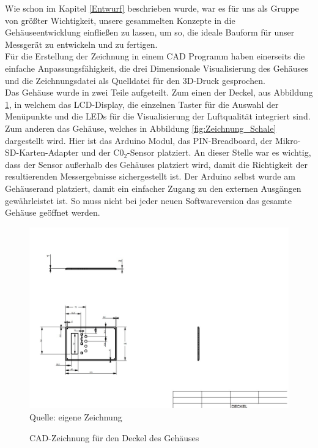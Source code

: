 \label{CADZeichnung}

Wie schon im Kapitel \ref{Entwurf} beschrieben wurde, war es für uns als Gruppe von größter Wichtigkeit, unsere gesammelten Konzepte in die Gehäuseentwicklung einfließen zu lassen, um so, die ideale Bauform für unser Messgerät zu entwickeln und zu fertigen. \\
Für die Erstellung der Zeichnung in einem CAD Programm haben einerseits die einfache Anpassungsfähigkeit, die drei Dimensionale Visualisierung des Gehäuses und die Zeichnungsdatei als Quelldatei für den 3D-Druck gesprochen.\\
Das Gehäuse wurde in zwei Teile aufgeteilt. Zum einen der Deckel, aus Abbildung \ref{fig:Zeichnung_Deckel}, in welchem das \ac{LCD}-Display, die einzelnen Taster für die Auswahl der Menüpunkte und die \ac{LED}s für die Visualisierung der Luftqualität integriert sind. \\
Zum anderen das Gehäuse, welches in Abbildung \ref{fig:Zeichnung_Schale} dargestellt wird. Hier ist das Arduino Modul, das PIN-Breadboard, der Mikro-SD-Karten-Adapter und der C0$_2$-Sensor platziert. An dieser Stelle war es wichtig, dass der Sensor außerhalb des Gehäuses platziert wird, damit die Richtigkeit der resultierenden Messergebnisse sichergestellt ist. Der Arduino selbst wurde am Gehäuserand platziert, damit ein einfacher Zugang zu den externen Ausgängen gewährleistet ist. So muss nicht bei jeder neuen Softwareversion das gesamte Gehäuse geöffnet werden.

\begin{figure}[!hbt]
	\centering
	\includegraphics[width=0.9\linewidth]{Images/CAD-Deckel}
	\footnotesize \\Quelle: eigene Zeichnung
	\caption{CAD-Zeichnung für den Deckel des Gehäuses}
	\label{fig:Zeichnung_Deckel}
\end{figure}

